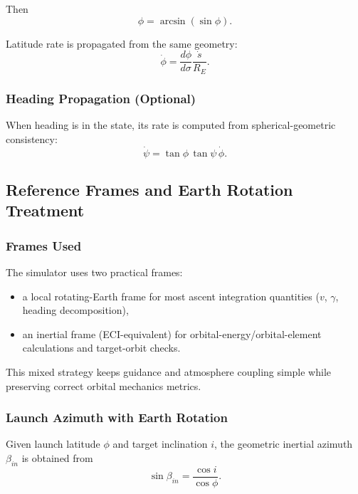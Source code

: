 Then
\begin{equation}
 \phi = \arcsin(\sin\phi).
\end{equation}

Latitude rate is propagated from the same geometry:
\begin{equation}
 \dot{\phi} = \frac{d\phi}{d\sigma}\frac{\dot{s}}{R_E}.
\end{equation}

\subsubsection{Heading Propagation (Optional)}

When heading is in the state, its rate is computed from spherical-geometric consistency:
\begin{equation}
 \dot{\psi} = \tan\phi\,\tan\psi\,\dot{\phi}.
\end{equation}

\subsection{Reference Frames and Earth Rotation Treatment}

\subsubsection{Frames Used}

The simulator uses two practical frames:
\begin{itemize}
\item a local rotating-Earth frame for most ascent integration quantities ($v$, $\gamma$, heading decomposition),
\item an inertial frame (ECI-equivalent) for orbital-energy/orbital-element calculations and target-orbit checks.
\end{itemize}

This mixed strategy keeps guidance and atmosphere coupling simple while preserving correct orbital mechanics metrics.

\subsubsection{Launch Azimuth with Earth Rotation}

Given launch latitude $\phi$ and target inclination $i$, the geometric inertial azimuth $\beta_{in}$ is obtained from
\begin{equation}
 \sin\beta_{in} = \frac{\cos i}{\cos\phi}.
\end{equation}

